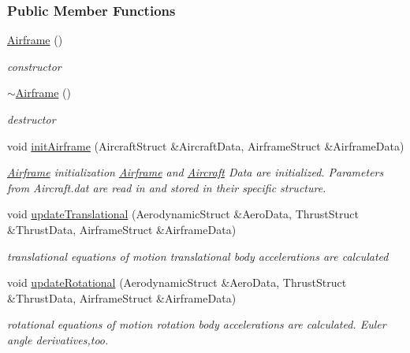 \subsubsection*{Public Member Functions}
\begin{DoxyCompactItemize}
\item 
\mbox{\label{group___airframe_a5e6632c7d0c5bc5b889de6cc2407944f}} 
\hyperlink{group___airframe_a5e6632c7d0c5bc5b889de6cc2407944f}{Airframe} ()
\begin{DoxyCompactList}\small\item\em constructor \end{DoxyCompactList}\item 
\mbox{\label{group___airframe_af849116afbf7c4d7d2d5c189ff68cb7d}} 
\hyperlink{group___airframe_af849116afbf7c4d7d2d5c189ff68cb7d}{$\sim$\+Airframe} ()
\begin{DoxyCompactList}\small\item\em destructor \end{DoxyCompactList}\item 
\mbox{\label{group___airframe_a57b5f7a74d11723186f34fc183e1581b}} 
void \hyperlink{group___airframe_a57b5f7a74d11723186f34fc183e1581b}{init\+Airframe} (Aircraft\+Struct \&Aircraft\+Data, Airframe\+Struct \&Airframe\+Data)
\begin{DoxyCompactList}\small\item\em \hyperlink{group___airframe_class_airframe}{Airframe} initialization \hyperlink{group___airframe_class_airframe}{Airframe} and \hyperlink{class_aircraft}{Aircraft} Data are initialized. Parameters from Aircraft.\+dat are read in and stored in their specific structure. \end{DoxyCompactList}\item 
void \hyperlink{group___airframe_a29b3a2854700f77468b6a94c5b7d0372}{update\+Translational} (Aerodynamic\+Struct \&Aero\+Data, Thrust\+Struct \&Thrust\+Data, Airframe\+Struct \&Airframe\+Data)
\begin{DoxyCompactList}\small\item\em translational equations of motion translational body accelerations are calculated \end{DoxyCompactList}\item 
void \hyperlink{group___airframe_acf8ce5ef44d07ca8815ca36d13cffcc7}{update\+Rotational} (Aerodynamic\+Struct \&Aero\+Data, Thrust\+Struct \&Thrust\+Data, Airframe\+Struct \&Airframe\+Data)
\begin{DoxyCompactList}\small\item\em rotational equations of motion rotation body accelerations are calculated. Euler angle derivatives,too. \end{DoxyCompactList}\end{DoxyCompactItemize}


